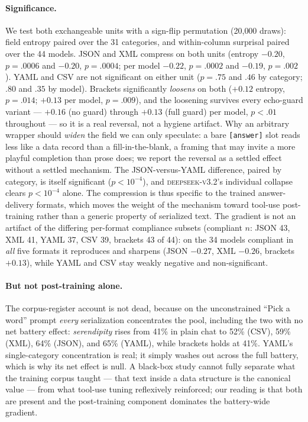 \documentclass[11pt]{article}
\begin{document}
\paragraph{Significance.}
We test both exchangeable units with a sign-flip permutation (20{,}000 draws): field entropy
paired over the 31 categories, and within-column surprisal paired over the 44 models. JSON and
XML compress on both units (entropy $-0.20$, $p=.0006$ and $-0.20$, $p=.0004$; per model
$-0.22$, $p=.0002$ and $-0.19$, $p=.002$). YAML and CSV are not significant on either unit
($p=.75$ and $.46$ by category; $.80$ and $.35$ by model). Brackets significantly \emph{loosens}
on both ($+0.12$ entropy, $p=.014$; $+0.13$ per model, $p=.009$), and the loosening survives
every echo-guard variant --- $+0.16$ (no guard) through $+0.13$ (full guard) per model, $p<.01$
throughout --- so it is a real reversal, not a hygiene artifact. Why an arbitrary wrapper should
\emph{widen} the field we can only speculate: a bare \texttt{[answer]} slot reads less like a
data record than a fill-in-the-blank, a framing that may invite a more playful completion than
prose does; we report the reversal as a settled effect without a settled mechanism.
The JSON-versus-YAML difference, paired by
category, is itself significant ($p<10^{-4}$), and \textsc{deepseek-v3.2}'s individual collapse
clears $p<10^{-4}$ alone. The compression is thus specific to the trained answer-delivery
formats, which moves the weight of the mechanism toward tool-use post-training rather than a
generic property of serialized text. The gradient is not an artifact of the differing per-format
compliance subsets (compliant $n$: JSON 43, XML 41, YAML 37, CSV 39, brackets 43 of 44): on the
34 models compliant in \emph{all} five formats it reproduces and sharpens (JSON $-0.27$, XML
$-0.26$, brackets $+0.13$), while YAML and CSV stay weakly negative and non-significant.

\paragraph{But not post-training alone.}
The corpus-register account is not dead, because on the unconstrained ``Pick a word'' prompt
\emph{every} serialization concentrates the pool, including the two with no net battery effect:
\emph{serendipity} rises from 41\% in plain chat to 52\% (CSV), 59\% (XML), 64\% (JSON), and
65\% (YAML), while brackets holds at 41\%. YAML's single-category concentration is real; it
simply washes out across the full battery, which is why its net effect is null. A black-box
study cannot fully separate what the training corpus taught --- that text inside a data
structure is the canonical value --- from what tool-use tuning reflexively reinforced; our
reading is that both are present and the post-training component dominates the battery-wide
gradient.
\end{document}
